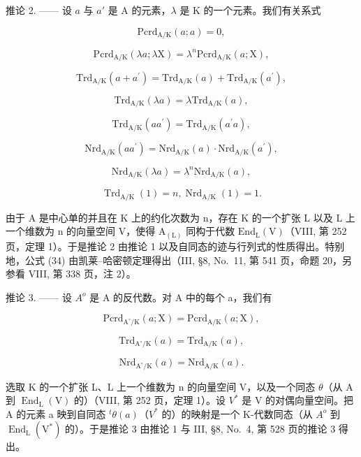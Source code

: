 推论 2. —— 设 \(a\) 与 \(a'\) 是 A 的元素，\(\lambda\) 是 K 的一个元素。我们有关系式

\[
\mathrm{Pcrd} _ {\mathrm{A/K}} (a; a) = 0,\tag{34}
\]

\[
\mathrm{Pcrd} _ {\mathrm{A/K}} (\lambda a; \lambda \mathrm{X}) = \lambda^ {n} \mathrm{Pcrd} _ {\mathrm{A/K}} (a; \mathrm{X}),\tag{35}
\]

\[
\mathrm{Trd} _ {\mathrm{A/K}} (a + a ^ {\prime}) = \mathrm{Trd} _ {\mathrm{A/K}} (a) + \mathrm{Trd} _ {\mathrm{A/K}} (a ^ {\prime}),\tag{36}
\]

\[
\mathrm{Trd} _ {\mathrm{A/K}} (\lambda a) = \lambda \mathrm{Trd} _ {\mathrm{A/K}} (a),
\]

\[
\mathrm{Trd} _ {\mathrm{A/K}} (a a ^ {\prime}) = \mathrm{Trd} _ {\mathrm{A/K}} (a ^ {\prime} a),\tag{37}
\]

\[
\mathrm{Nrd} _ {\mathrm{A/K}} (a a ^ {\prime}) = \mathrm{Nrd} _ {\mathrm{A/K}} (a) \cdot \mathrm{Nrd} _ {\mathrm{A/K}} (a ^ {\prime}),\tag{38}
\]

\[
\mathrm{Nrd} _ {\mathrm{A/K}} (\lambda a) = \lambda^ {n} \mathrm{Nrd} _ {\mathrm{A/K}} (a),
\]

\[
\operatorname{Trd} _ {\mathrm{A} / \mathrm{K}} (1) = n, \operatorname{Nrd} _ {\mathrm{A} / \mathrm{K}} (1) = 1.\tag{39}
\]

由于 A 是中心单的并且在 K 上的约化次数为 n，存在 K 的一个扩张 L 以及 L 上一个维数为 n 的向量空间 V，使得 \(\mathrm{A}_{(\mathrm{L})}\) 同构于代数 \(\mathrm{End}_{\mathrm{L}}(\mathrm{V})\)（VIII, 第 252 页，定理 1）。于是推论 2 由推论 1 以及自同态的迹与行列式的性质得出。特别地，公式 (34) 由凯莱--哈密顿定理得出（III, §8, No.~11, 第 541 页，命题 20，另参看 VIII, 第 338 页，注 2）。

推论 3. —— 设 \(A^{o}\) 是 A 的反代数。对 A 中的每个 a，我们有

\[
\mathrm{Pcrd} _ {\mathrm {A^ {\circ} /K}} (a; \mathrm{X}) = \mathrm{Pcrd} _ {\mathrm{A/K}} (a; \mathrm{X}),\tag{40}
\]

\[
\mathrm{Trd} _ {\mathrm {A^{\circ} /K}} (a) = \mathrm{Trd} _ {\mathrm{A/K}} (a),\tag{41}
\]

\[
\mathrm{Nrd} _ {\mathrm {A^{\circ} /K}} (a) = \mathrm{Nrd} _ {\mathrm{A/K}} (a).\tag{42}
\]

选取 K 的一个扩张 L、L 上一个维数为 n 的向量空间 V，以及一个同态 \(\theta\)（从 A 到 \(\operatorname{End}_{\mathrm{L}}(\mathrm{V})\) 的）（VIII, 第 252 页，定理 1）。设 \(V^{*}\) 是 V 的对偶向量空间。把 A 的元素 a 映到自同态 \({}^{t}\theta(a)\)（\(V^{*}\) 的）的映射是一个 K-代数同态（从 \(A^{o}\) 到 \(\operatorname{End}_{\mathrm{L}}(\mathrm{V}^{*})\) 的）。于是推论 3 由推论 1 与 III, §8, No.~4, 第 528 页的推论 3 得出。

